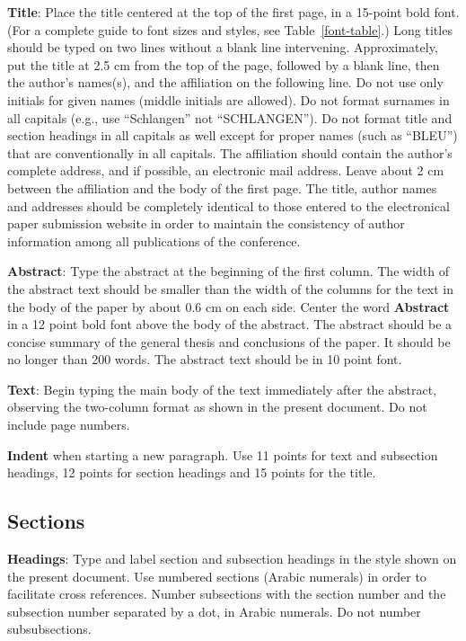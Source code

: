 \documentclass[11pt]{article}
\begin{document}
{\bf Title}: Place the title centered at the top of the first page, in
a 15-point bold font. (For a complete guide to font sizes and styles, 
see Table~\ref{font-table}.) Long titles should be typed on two lines without
a blank line intervening. Approximately, put the title at 2.5 cm from
the top of the page, followed by a blank line, then the author's
names(s), and the affiliation on the following line. Do not use only
initials for given names (middle initials are allowed). Do not format surnames
in all capitals (e.g., use ``Schlangen'' not ``SCHLANGEN'').
Do not format title and section headings in all capitals as well
except for proper names (such as ``BLEU'') that are conventionally
in all capitals.
The affiliation should contain the author's complete address, and if
possible, an electronic mail address. Leave about 2 cm between the
affiliation and the body of the first page.
The title, author names and addresses should be completely
identical to those entered to the electronical paper submission
website in order to maintain the consistency of author information
among all publications of the conference.

{\bf Abstract}: Type the abstract at the beginning of the first
column. The width of the abstract text should be smaller than the
width of the columns for the text in the body of the paper by about
0.6 cm on each side. Center the word {\bf Abstract} in a 12 point bold
font above the body of the abstract. The abstract should be a concise
summary of the general thesis and conclusions of the paper. It should
be no longer than 200 words. The abstract text should be in 10 point font.

{\bf Text}: Begin typing the main body of the text immediately after
the abstract, observing the two-column format as shown in 
the present document. Do not include page numbers.

{\bf Indent} when starting a new paragraph. Use 11 points for text and 
subsection headings, 12 points for section headings and 15 points for
the title. 

\subsection{Sections}

{\bf Headings}: Type and label section and subsection headings in the
style shown on the present document.  Use numbered sections (Arabic
numerals) in order to facilitate cross references. Number subsections
with the section number and the subsection number separated by a dot,
in Arabic numerals. Do not number subsubsections.
\end{document}
